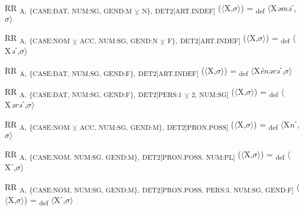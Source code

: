 {\begin{exe}
 RR \textsubscript{A,} \textsubscript{\{CASE:DAT, NUM:SG, GEND:M} \textsubscript{${\veebar}$}\textsubscript{ N\},} \textsubscript{DET2[ART.INDEF]} ($\langle$X,$\sigma $$\rangle$) = \textsubscript{def} $\langle$X\textit{əmə}ˊ,$\sigma $$\rangle$
\end{exe}

\begin{exe}
 RR \textsubscript{A,} \textsubscript{\{CASE:NOM} \textsubscript{${\veebar}$}\textsubscript{ ACC, NUM:SG, GEND:N} \textsubscript{${\veebar}$}\textsubscript{ F\},} \textsubscript{DET2[ART.INDEF]} ($\langle$X,$\sigma $$\rangle$) = \textsubscript{def} $\langle$X\textit{ə}ˊ,$\sigma $$\rangle$
\end{exe}

\begin{exe}
 RR \textsubscript{A,} \textsubscript{\{CASE:DAT, NUM:SG, GEND:F\},} \textsubscript{DET2[ART.INDEF]} ($\langle$X,$\sigma $$\rangle$) = \textsubscript{def} $\langle$X\textit{ẽnərə}ˊ,$\sigma $$\rangle$
\end{exe}

\begin{exe}
 RR \textsubscript{A,} \textsubscript{\{CASE:DAT, NUM:SG, GEND:F\},} \textsubscript{DET2[PERS:1} \textsubscript{${\veebar}$}\textsubscript{ 2, NUM:SG]} ($\langle$X,$\sigma $$\rangle$) = \textsubscript{def} $\langle$X\textit{ərə}ˊ,$\sigma $$\rangle$
\end{exe}

\begin{exe}
 RR \textsubscript{A,} \textsubscript{\{CASE:NOM} \textsubscript{${\veebar}$}\textsubscript{ ACC, NUM:SG, GEND:M\},} \textsubscript{DET2[PRON.POSS]} ($\langle$X,$\sigma $$\rangle$) = \textsubscript{def} $\langle$X\textit{n}ˊ,$\sigma $$\rangle$
\end{exe}

\begin{exe}
 RR \textsubscript{A,} \textsubscript{\{CASE:NOM, NUM:SG, GEND:M\},} \textsubscript{DET2[PRON.POSS, NUM:PL]} ($\langle$X,$\sigma $$\rangle$) = \textsubscript{def} $\langle$Xˊ,$\sigma $$\rangle$
\end{exe}

\begin{exe}
 RR \textsubscript{A,} \textsubscript{\{CASE:NOM, NUM:SG, GEND:M\},} \textsubscript{DET2[PRON.POSS, PERS:3, NUM:SG, GEND:F]} ($\langle$X,$\sigma $$\rangle$) = \textsubscript{def} $\langle$Xˊ,$\sigma $$\rangle$
\end{exe}

}
